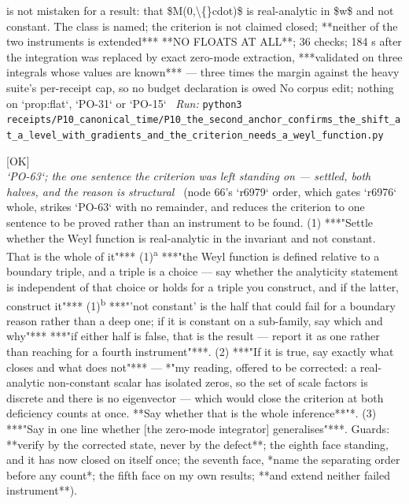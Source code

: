 \begin{description}
is not mistaken for a result: that \$M(0,\textbackslash\{\}cdot)\$ is real-analytic in \$w\$ and not constant. The class is named; the criterion is not claimed closed; **neither of the two instruments is extended***  **NO FLOATS AT ALL**; 36 checks; 184 s after the integration was replaced by exact zero-mode extraction, ***validated on three integrals whose values are known*** --- three times the margin against the heavy suite's per-receipt cap, so no budget declaration is owed  No corpus edit; nothing on `prop:flat`, `PO-31` or `PO-15`
\ \emph{Run:} \texttt{python3 receipts/P10\_canonical\_time/P10\_the\_second\_anchor\_confirms\_the\_shift\_at\_a\_level\_with\_gradients\_and\_the\_criterion\_needs\_a\_weyl\_function.py}
\item[\rcptlabel{P10_the_operator_is_second_order_in_momentum_so_the_weyl_function_is_real_analytic_and_strictly_monotone}{P10R39}\textbf{P10R39}\quad\texttt{P10\_the\_operator\_is\_second\_order\_in\_momentum\_so\_the\_weyl\_function\_is\_real\_analytic\_and\_strictly\_monotone}]\hfill\textsf{[OK]}\\
\textit{`PO-63`; the one sentence the criterion was left standing on --- settled, both halves, and the reason is structural} \ (node 66's `r6979` order, which gates `r6976` whole, strikes `PO-63` with no remainder, and reduces the criterion to one sentence to be proved rather than an instrument to be found. (1) ***"Settle whether the Weyl function is real-analytic in the invariant and not constant. That is the whole of it"*** (1)\textsuperscript{a} ***"the Weyl function is defined relative to a boundary triple, and a triple is a choice --- say whether the analyticity statement is independent of that choice or holds for a triple you construct, and if the latter, construct it"*** (1)\textsuperscript{b} ***"'not constant' is the half that could fail for a boundary reason rather than a deep one; if it is constant on a sub-family, say which and why"***  ***"if either half is false, that is the result --- report it as one rather than reaching for a fourth instrument"***. (2) ***"If it is true, say exactly what closes and what does not"*** --- *"my reading, offered to be corrected: a real-analytic non-constant scalar has isolated zeros, so the set of scale factors is discrete and there is no eigenvector --- which would close the criterion at both deficiency counts at once. **Say whether that is the whole inference**"*. (3) ***"Say in one line whether [the zero-mode integrator] generalises"***.  Guards: **verify by the corrected state, never by the defect**; the eighth face standing, and it has now closed on itself once; the seventh face, *name the separating order before any count*; the fifth face on my own results; **and extend neither failed instrument**). 

\end{description}
